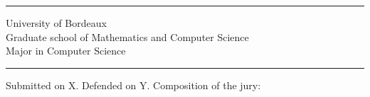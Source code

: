 {\begin{center}
{\begin{large}
\begin{normalsize}
            \rule{0.05\textwidth}{0.4pt}

            University of Bordeaux \\
            Graduate school of Mathematics and Computer Science \\
            Major in Computer Science \\
        \end{normalsize}
    
        \rule{0.2\textwidth}{0.6pt}

    \end{large}
    }
\end{center}

\begin{small}
    
\noindent Submitted on X. Defended on Y.
\vfill
\noindent Composition of the jury:

%
\end{small}


}

